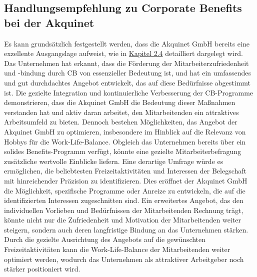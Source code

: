 \subsection{Handlungsempfehlung zu Corporate Benefits bei der Akquinet}
Es kann grundsätzlich festgestellt werden, dass die Akquinet GmbH bereits eine exzellente Ausgangslage aufweist, wie in \hyperref[sec:auswertung]{Kapitel 2.4} detailliert dargelegt wird. Das Unternehmen hat erkannt, dass die Förderung der Mitarbeiterzufriedenheit und -bindung durch CB von essenzieller Bedeutung ist, und hat ein umfassendes und gut durchdachtes Angebot entwickelt, das auf diese Bedürfnisse abgestimmt ist. Die gezielte Integration und kontinuierliche Verbesserung der CB-Programme demonstrieren, dass die Akquinet GmbH die Bedeutung dieser Maßnahmen verstanden hat und aktiv daran arbeitet, den Mitarbeitenden ein attraktives Arbeitsumfeld zu bieten.\newline \newline
Dennoch bestehen Möglichkeiten, das Angebot der Akquinet GmbH zu optimieren, insbesondere im Hinblick auf die Relevanz von Hobbys für die Work-Life-Balance. Obgleich das Unternehmen bereits über ein solides Benefits-Programm verfügt, könnte eine gezielte Mitarbeiterbefragung zusätzliche wertvolle Einblicke liefern. Eine derartige Umfrage würde es ermöglichen, die beliebtesten Freizeitaktivitäten und Interessen der Belegschaft mit hinreichender Präzision zu identifizieren. Dies eröffnet der Akquinet GmbH die Möglichkeit, spezifische Programme oder Anreize zu entwickeln, die auf die identifizierten Interessen zugeschnitten sind.\newline
Ein erweitertes Angebot, das den individuellen Vorlieben und Bedürfnissen der Mitarbeitenden Rechnung trägt, könnte nicht nur die Zufriedenheit und Motivation der Mitarbeitenden weiter steigern, sondern auch deren langfristige Bindung an das Unternehmen stärken. Durch die gezielte Ausrichtung des Angebots auf die gewünschten Freizeitaktivitäten kann die Work-Life-Balance der Mitarbeitenden weiter optimiert werden, wodurch das Unternehmen als attraktiver Arbeitgeber noch stärker positioniert wird.